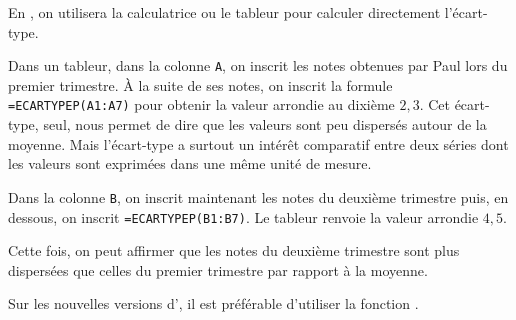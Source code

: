 \documentclass[10pt,openright,twoside,french]{book}
\begin{document}
\begin{Rmq}
    En \premiere\stmg, on utilisera la calculatrice ou le tableur pour calculer directement l'écart-type.
\end{Rmq}

\begin{Exemple}
Dans un tableur, dans la colonne \texttt{A}, on inscrit les notes obtenues par Paul lors du premier trimestre. À la suite de ses notes, on inscrit la formule \texttt{=ECARTYPEP(A1:A7)} pour obtenir la valeur arrondie au dixième $2,3$. Cet écart-type, seul, nous permet de dire que les valeurs sont peu dispersés autour de la moyenne. Mais l'écart-type a surtout un intérêt comparatif entre deux séries dont les valeurs sont exprimées dans une même unité de mesure.

Dans la colonne \texttt B, on inscrit maintenant les notes du deuxième trimestre puis, en dessous, on inscrit \texttt{=ECARTYPEP(B1:B7)}. Le tableur renvoie la valeur arrondie $4,5$.

Cette fois, on peut affirmer que les notes du deuxième trimestre sont plus dispersées que celles du premier trimestre par rapport à la moyenne.
\end{Exemple}

\begin{Rmq}
    Sur les nouvelles versions d', il est préférable d'utiliser la fonction .
\end{Rmq}
\end{document}
